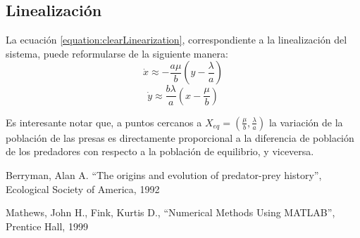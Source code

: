 \documentclass[journal, monochrome]{IEEEtran}
\begin{document}
\subsection{Linealización}

La ecuación \ref{equation:clearLinearization}, correspondiente a la linealización del sistema, puede reformularse de la siguiente manera:
\begin{equation}
\dot{x} \approx -\frac{a \mu}{b} \left( y - \frac{\lambda}{a}\right)
\label{equation:preysLinear2}
\end{equation}
\begin{equation}
\dot{y} \approx \frac{b \lambda}{a}\left(x - \frac{\mu}{b}\right)
\label{equation:predatorsLinear2}
\end{equation}

Es interesante notar que, a puntos cercanos a $X_{eq} = (\frac{\mu}{b}, \frac{\lambda}{a})$ la variación de la población de las presas es directamente proporcional a la diferencia de población de los predadores con respecto a la población de equilibrio, y viceversa. 







%
%
%
%


\begin{thebibliography}{1}

	Berryman, Alan A.
	``The origins and evolution of predator-prey history'',
	Ecological Society of America,
	1992

\vspace{0.2cm}

	Mathews, John H.,
	Fink, Kurtis D.,
	``Numerical Methods Using MATLAB'',
	Prentice Hall,
	1999
	
\end{thebibliography}
\end{document}
